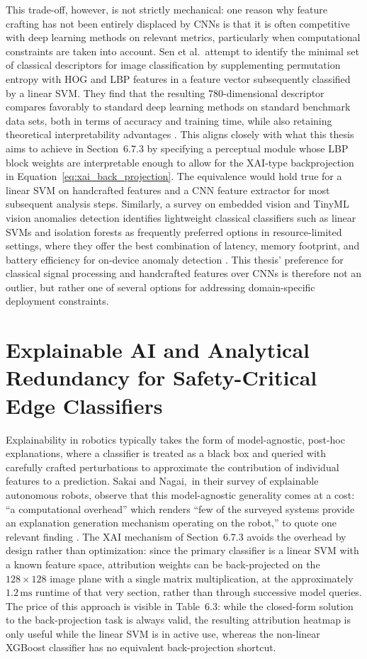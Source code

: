 This trade-off, however, is not strictly mechanical: one reason why feature crafting has not been entirely displaced by CNNs is that it is often competitive with deep learning methods on relevant metrics, particularly when computational constraints are taken into account. Sen et al.\ attempt to identify the minimal set of classical descriptors for image classification by supplementing permutation entropy with HOG and LBP features in a feature vector subsequently classified by a linear SVM. They find that the resulting 780-dimensional descriptor compares favorably to standard deep learning methods on standard benchmark data sets, both in terms of accuracy and training time, while also retaining theoretical interpretability advantages \cite{sen2025feature}. This aligns closely with what this thesis aims to achieve in Section~6.7.3 by specifying a perceptual module whose LBP block weights are interpretable enough to allow for the XAI-type backprojection in Equation~\eqref{eq:xai_back_projection}. The equivalence would hold true for a linear SVM on handcrafted features and a CNN feature extractor for most subsequent analysis steps. Similarly, a survey on embedded vision and TinyML vision anomalies detection identifies lightweight classical classifiers such as linear SVMs and isolation forests as frequently preferred options in resource-limited settings, where they offer the best combination of latency, memory footprint, and battery efficiency for on-device anomaly detection \cite{benmachiche2026realtime}. This thesis' preference for classical signal processing and handcrafted features over CNNs is therefore not an outlier, but rather one of several options for addressing domain-specific deployment constraints.

\section{Explainable AI and Analytical Redundancy for Safety-Critical Edge Classifiers}

Explainability in robotics typically takes the form of model-agnostic, post-hoc explanations, where a classifier is treated as a black box and queried with carefully crafted perturbations to approximate the contribution of individual features to a prediction. Sakai and Nagai,\ in their survey of explainable autonomous robots, observe that this model-agnostic generality comes at a cost: ``a computational overhead'' which renders ``few of the surveyed systems provide an explanation generation mechanism operating on the robot,'' to quote one relevant finding \cite{sakai2022explainable}. The XAI mechanism of Section~6.7.3 avoids the overhead by design rather than optimization: since the primary classifier is a linear SVM with a known feature space, attribution weights can be back-projected on the $128\times128$ image plane with a single matrix multiplication, at the approximately $1.2\,\text{ms}$ runtime of that very section, rather than through successive model queries. The price of this approach is visible in Table~6.3: while the closed-form solution to the back-projection task is always valid, the resulting attribution heatmap is only useful while the linear SVM is in active use, whereas the non-linear XGBoost classifier has no equivalent back-projection shortcut.

